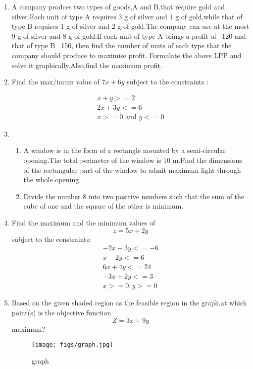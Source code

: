 \documentclass{article}
\begin{document}
\begin{enumerate} 
 \item A company prodces two types of goods,A and B,that require gold and silver.Each unit of type A requires $3$ g of silver and $1$ g of gold,while that of type B requires $1$ g of silver and $2$ g of gold.The company can use at the most $9$ g of silver and $8$ g of gold.If each unit of  type A brings a profit of \rupee~120 and that of type B \rupee~150, then find the number of units of each type that the company should produce to maximise profit.
		Formulate the above LPP and solve it graphically.Also,find the maximum profit.
\item Find the max/imum value of $7x+6y$ subject to the constraints :

		\begin{align}
			   x+y>=2 \\
			  2x+3y<=6 \\
			 x>=0{\text{ and }} y<=0 
		\end{align}
\item \begin{enumerate} %
			\item A window is in the form of a rectangle mounted by a semi-circular opening.The total perimeter of the window is $10$ m.Find the dimensions of the rectangular part of the window to admit maximum light through the whole opening.
			\item Divide the number $8$ into two positive numbers such that the sum of the cube of one and the square of the other is minimum.
	               \end{enumerate}
\item 
 Find the maximum and the minimum values of $$z=5x+2y$$ subject to the constraints:
	\begin{align}
		-2x-3y<=-6 \\
		   x-2y<=6 \\
		   6x+4y<=24 \\
		    -3x+2y<=3 \\
		    x>=0,y>=0 
	\end{align}
	\item Based on the given shaded region as the feasible region in the graph,at which point(s) is the objective function $$Z=3x+9y$$ maximum?
	\begin{figure}[H]
	\centering
		\texttt{[image: figs/graph.jpg]}
		\caption{graph}
		\label{fig:graph.jpg}
	\end{figure}
		\begin{enumerate}[label=(\Alph*)]

\end{enumerate}
\end{enumerate}
\end{document}
